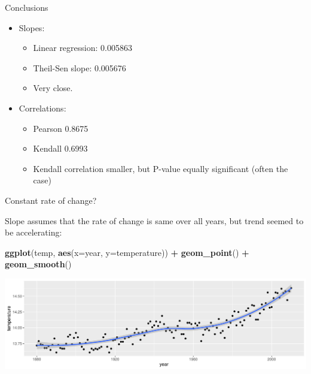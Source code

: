 \documentclass[
  ignorenonframetext,
]{beamer}
\newenvironment{Shaded}{\begin{snugshade}}{\end{snugshade}}
\newcommand{\DataTypeTok}[1]{\textcolor[rgb]{0.13,0.29,0.53}{#1}}
\newcommand{\KeywordTok}[1]{\textcolor[rgb]{0.13,0.29,0.53}{\textbf{#1}}}
\newcommand{\NormalTok}[1]{#1}
\newcommand{\OperatorTok}[1]{\textcolor[rgb]{0.81,0.36,0.00}{\textbf{#1}}}
\newcommand{\StringTok}[1]{\textcolor[rgb]{0.31,0.60,0.02}{#1}}
\providecommand{\tightlist}{%
  \setlength{\itemsep}{0pt}\setlength{\parskip}{0pt}}
\begin{document}
\begin{frame}{Conclusions}
\protect\hypertarget{conclusions-3}{}

\begin{itemize}
\tightlist
\item
  Slopes:

  \begin{itemize}
  \tightlist
  \item
    Linear regression: 0.005863
  \item
    Theil-Sen slope: 0.005676
  \item
    Very close.
  \end{itemize}
\item
  Correlations:

  \begin{itemize}
  \tightlist
  \item
    Pearson 0.8675
  \item
    Kendall 0.6993
  \item
    Kendall correlation smaller, but P-value equally significant (often
    the case)
  \end{itemize}
\end{itemize}

\end{frame}

\begin{frame}[fragile]{Constant rate of change?}
\protect\hypertarget{constant-rate-of-change}{}

Slope assumes that the rate of change is same over all years, but trend
seemed to be accelerating:

\begin{Shaded}
\begin{Highlighting}[]
\KeywordTok{ggplot}\NormalTok{(temp, }\KeywordTok{aes}\NormalTok{(}\DataTypeTok{x=}\NormalTok{year, }\DataTypeTok{y=}\NormalTok{temperature)) }\OperatorTok{+}\StringTok{ }
\StringTok{  }\KeywordTok{geom_point}\NormalTok{() }\OperatorTok{+}\StringTok{ }\KeywordTok{geom_smooth}\NormalTok{()}
\end{Highlighting}
\end{Shaded}

\includegraphics{slides_d29_files/figure-beamer/unnamed-chunk-518-1.pdf}

\end{frame}
\end{document}
